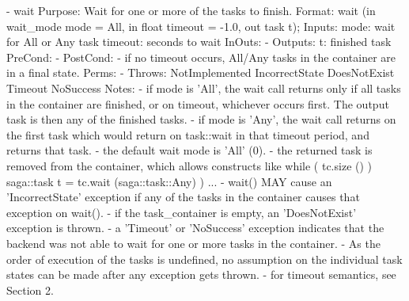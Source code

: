 \begin{myspec}
 
    - wait
      Purpose:  Wait for one or more of the tasks to finish.
      Format:   wait                 (in  wait_mode mode = All,
                                      in  float  timeout = -1.0,
                                      out task   t);
      Inputs:   mode:                 wait for All or Any task
                timeout:              seconds to wait
      InOuts:   -
      Outputs:  t:                    finished task
      PreCond:  -
      PostCond: - if no timeout occurs, All/Any tasks in the 
                  container are in a final state.
      Perms:    -
      Throws:   NotImplemented
                IncorrectState
                DoesNotExist
                Timeout
                NoSuccess
      Notes:    - if mode is 'All', the wait call returns only
                  if all tasks in the container are finished,
                  or on timeout, whichever occurs first.
                  The output task is then any of the finished
                  tasks.
                - if mode is 'Any', the wait call returns on the
                  first task which would return on task::wait in
                  that timeout period, and returns that task.
                - the default wait mode is 'All' (0).
                - the returned task is removed from the
                  container, which allows constructs like
                    while ( tc.size () )
                    { 
                       saga::task t = tc.wait (saga::task::Any) ) 
                       ... 
                    }
                - wait() MAY cause an 'IncorrectState' exception
                  if any of the tasks in the container causes 
                  that exception on wait().
                - if the task_container is empty, an
                  'DoesNotExist' exception is thrown.
                - a 'Timeout' or 'NoSuccess' exception indicates
                  that the backend was not able to wait for one 
                  or more tasks in the container.
                - As the order of execution of the tasks is
                  undefined, no assumption on the individual
                  task states can be made after any
                  exception gets thrown.
                - for timeout semantics, see Section 2.
 

\end{myspec}
